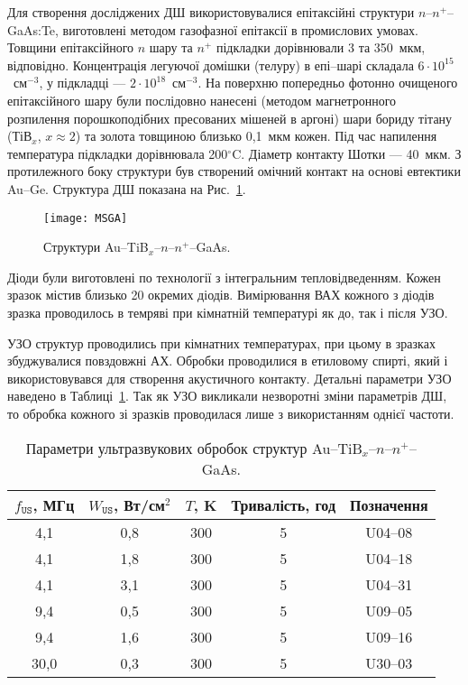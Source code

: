 \documentclass[a4paper,14pt,oneside,openany]{memoir}
\begin{document}
Для створення досліджених ДШ використовувалися епітаксійні структури $n$--$n^+$--GaAs:Te,
виготовлені методом газофазної епітаксії в промислових умовах.
Товщини епітаксійного $n$ шару та $n^+$ підкладки дорівнювали 3 та 350~мкм, відповідно.
Концентрація легуючої домішки (телуру) в епі--шарі складала $6\cdot10^{15}$~см$^{-3}$,
у підкладці --- $2\cdot10^{18}$~см$^{-3}$.
На поверхню попередньо фотонно очищеного епітаксійного шару були послідовно нанесені
(методом магнетронного розпилення порошкоподібних пресованих мішеней в аргоні)
шари бориду тітану (ТіВ$_x$, $x\approx2$) та золота товщиною близько 0,1~мкм кожен.
Під час напилення температура підкладки дорівнювала 200$^\circ$C.
Діаметр контакту Шотки --- 40~мкм.
З протилежного боку структури був створений омічний контакт на основі евтектики Au--Ge.
Структура ДШ показана на Рис.~\ref{figMSGA}.

\begin{figure}%
\center
\texttt{[image: MSGA]}%
\caption{\label{figMSGA}
Структури Au--TiB$_x$--$n$--$n^+$--GaAs.
}
\end{figure}

Діоди були виготовлені по технології з інтегральним тепловідведенням.
Кожен зразок містив близько 20 окремих діодів.
Вимірювання ВАХ кожного з діодів зразка проводилось в темряві при кімнатній температурі
як до, так і після УЗО.

УЗО структур проводились при кімнатних температурах, при цьому в зразках збуджувалися повздовжні АХ.
Обробки проводилися в етиловому спирті, який і використовувався для створення акустичного контакту.
Детальні параметри УЗО наведено в Таблиці~\ref{tabUST}.
Так як УЗО викликали незворотні зміни параметрів ДШ, то обробка кожного зі зразків проводилася лише з використанням однієї частоти.

\begin{table}
\caption{\label{tabUST}Параметри ультразвукових обробок структур Au--TiB$_x$--$n$--$n^+$--GaAs.
}
\center
\begin{tabular}{|c|c|c|c|c|}
\hline
$f_\mathtt{US}$, МГц&$W_{\mathtt{US}}$, Вт/см$^2$&$T$, K&Тривалість, год &Позначення\\
\hline
4,1&0,8&300&5&U04--08\\ \hline
4,1&1,8&300&5&U04--18\\ \hline
4,1&3,1&300&5&U04--31\\ \hline
9,4&0,5&300&5&U09--05\\ \hline
9,4&1,6&300&5&U09--16\\ \hline
30,0&0,3&300&5&U30--03\\ \hline
\end{tabular}
\end{table}
\end{document}
